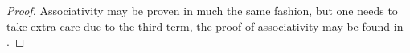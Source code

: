 \begin{proof}
\begin{comment}
	Therefore consider the algebraic tensor product $W\odot Z$ defined as 
	Consider $W\odot Z$ with right-seminorm defined as
	\begin{align*}
		&\sum_{i=1}^n \xi_i\tens \eta_i \in W\odot Z \\
		&\norm{\sum_{i=1}^n \xi_i\tens \eta_i}_{W\tens Z}^2=\norm{\sum_{i,j=1}^n \ip{\xi_i}{\xi_j}_C \tens \ip{\eta_i}{\eta_j}_D}_{C\tens_T D} \\
		&\mathcal{N}=\{z\in W\odot Z \mid \norm{z}_{W\tens Z}=0 \} \\
		&V=\overline{(W\odot Z)/\mathcal{N}}^{\norm{\cdot}_{W\tens Z}}
	\end{align*}
	and define the left-norm analogously. 
	Note that the choice of left or right-norm is irrelevant for the completion as the two norms agree since $W$ and $Z$ are both assumed to be imprimitivity modules. 
	We need to show that $V$ is an $(A\tens_T B)-_T(C\tens_T D)$ imprimitivity module.  By definition, the left inner product is $A\tens_T B$-valued, and the image of inner product from $W$ is dense in $A$ and the image of the inner product from $Z$ is dense in $B$. Therefore, given an element $z=\sum_{i=1}^n x_i\tens y_i \in A\tens_T B,x_i\in A,y_i\in B$ and any $\epsilon>0$ there are elements $\xi\in Z\odot W$ and $\eta\in Z\odot W$ such that $\norm{{}_{A\tens_T B}\ip{\xi}{\eta}-z}<\epsilon$. 
	By definition of the completion of $Z\tens W$ and the characterization of $A\tens_T B$ in \Cref{density} we may approximate any element in $A\tens_T B$ in this fashion, showing fullness. The proof for the right-inner product is the same. 
	\end{comment}
	Associativity may be proven in much the same fashion, but one needs to take extra care due to the third term, the proof of associativity may be found in \cite[Theorem 6.3]{raeburncont}.
\end{proof}
